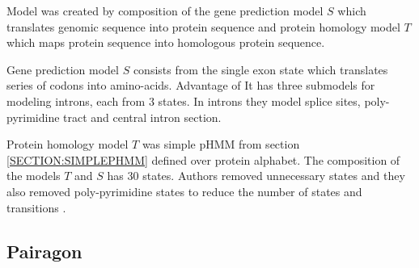 Model was created by composition of the gene prediction model $S$ which
translates genomic sequence into protein sequence and protein homology model $T$
which maps protein sequence into homologous protein sequence.

Gene prediction model $S$ consists from the single exon state which translates
series of codons into amino-acids. Advantage of It has three submodels for
modeling introns, each from $3$ states. In introns they model splice sites, 
poly-pyrimidine tract and central intron section.

Protein homology model $T$ was simple pHMM from section \ref{SECTION:SIMPLEPHMM}
defined over protein alphabet.  The composition of the models $T$ and $S$ has
$30$ states. Authors removed unnecessary states and they also removed
poly-pyrimidine states to reduce the number of states and transitions
\cite{GeneWise2004}.




\subsection{Pairagon}

